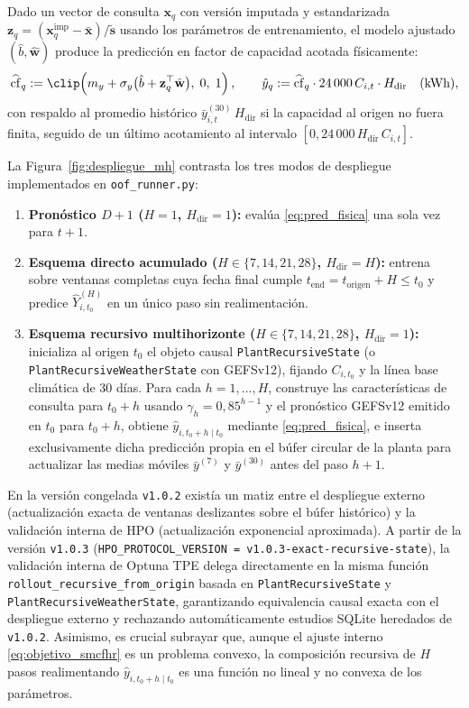 Dado un vector de consulta $\mathbf{x}_q$ con versión imputada y estandarizada $\mathbf{z}_q = (\mathbf{x}^{\mathrm{imp}}_q - \bar{\mathbf{x}})/\tilde{\mathbf{s}}$ usando los parámetros de entrenamiento, el modelo ajustado $(\hat{b}, \hat{\mathbf{w}})$ produce la predicción en factor de capacidad acotada físicamente:
\begin{equation}
\widehat{\mathrm{cf}}_q := \clip\!\left(m_y + \sigma_y \big(\hat{b} + \mathbf{z}_q^\top \hat{\mathbf{w}}\big),\; 0,\; 1\right),
\qquad
\hat{y}_q := \widehat{\mathrm{cf}}_q \cdot 24\,000\,C_{i,t} \cdot H_{\mathrm{dir}} \quad (\text{kWh}),
\label{eq:pred_fisica}
\end{equation}
con respaldo al promedio histórico $\bar{y}^{(30)}_{i,t}\,H_{\mathrm{dir}}$ si la capacidad al origen no fuera finita, seguido de un último acotamiento al intervalo $[0, 24\,000\,H_{\mathrm{dir}}\,C_{i,t}]$.

La Figura~\ref{fig:despliegue_mh} contrasta los tres modos de despliegue implementados en \texttt{oof\_runner.py}:
\begin{enumerate}
    \item \textbf{Pronóstico $D+1$ ($H=1$, $H_{\mathrm{dir}}=1$):} evalúa \eqref{eq:pred_fisica} una sola vez para $t+1$.
    \item \textbf{Esquema directo acumulado ($H \in \{7,14,21,28\}$, $H_{\mathrm{dir}}=H$):} entrena sobre ventanas completas cuya fecha final cumple $t_{\mathrm{end}} = t_{\mathrm{origen}} + H \le t_0$ y predice $\hat{Y}_{i,t_0}^{(H)}$ en un único paso sin realimentación.
    \item \textbf{Esquema recursivo multihorizonte ($H \in \{7,14,21,28\}$, $H_{\mathrm{dir}}=1$):} inicializa al origen $t_0$ el objeto causal \texttt{PlantRecursiveState} (o \texttt{PlantRecursiveWeatherState} con GEFSv12), fijando $C_{i,t_0}$ y la línea base climática de $30$ días. Para cada $h = 1,\dots,H$, construye las características de consulta para $t_0 + h$ usando $\gamma_h = 0{,}85^{h-1}$ y el pronóstico GEFSv12 emitido en $t_0$ para $t_0 + h$, obtiene $\hat{y}_{i,t_0+h \mid t_0}$ mediante \eqref{eq:pred_fisica}, e inserta exclusivamente dicha predicción propia en el búfer circular de la planta para actualizar las medias móviles $\bar{y}^{(7)}$ y $\bar{y}^{(30)}$ antes del paso $h+1$.
\end{enumerate}

En la versión congelada \texttt{v1.0.2} existía un matiz entre el despliegue externo (actualización exacta de ventanas deslizantes sobre el búfer histórico) y la validación interna de HPO (actualización exponencial aproximada). A partir de la versión \texttt{v1.0.3} (\texttt{HPO\_PROTOCOL\_VERSION = v1.0.3-exact-recursive-state}), la validación interna de Optuna TPE delega directamente en la misma función \texttt{rollout\_recursive\_from\_origin} basada en \texttt{PlantRecursiveState} y \texttt{PlantRecursiveWeatherState}, garantizando equivalencia causal exacta con el despliegue externo y rechazando automáticamente estudios SQLite heredados de \texttt{v1.0.2}. Asimismo, es crucial subrayar que, aunque el ajuste interno \eqref{eq:objetivo_smcfhr} es un problema convexo, la composición recursiva de $H$ pasos realimentando $\hat{y}_{i,t_0+h \mid t_0}$ es una función no lineal y no convexa de los parámetros.

